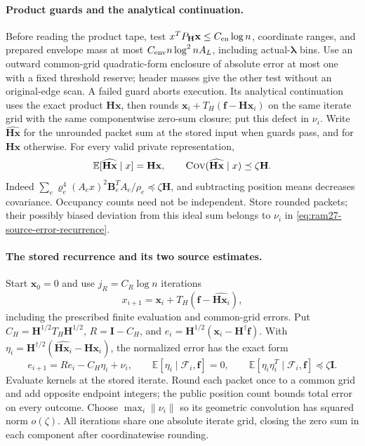 \documentclass[11pt]{article}
\theoremstyle{remark}
\newcommand{\BB}{\mathbf B}
\newcommand{\II}{\mathbf I}
\newcommand{\HH}{\mathbf H}
\newcommand{\ff}{\mathbf f}
\newcommand{\llambda}{\boldsymbol{\lambda}}
\newcommand{\vvr}{\boldsymbol{\varrho}}
\newcommand{\xx}{\mathbf x}
\newcommand{\Cov}{\textsc{Cov}}
\newcommand{\Ex}{\mathbb E}
\newcommand{\norm}[1]{\lVert#1\rVert}
\begin{document}
\paragraph{Product guards and the analytical continuation.}
Before reading the product tape, test $x^TP_{\HH}\xx\le C_{\rm en}\log n$, coordinate
ranges, and prepared envelope mass at most $C_{\rm env}n\log^2 nA_L$, including
actual-$\llambda$ bins.
Use an outward common-grid quadratic-form enclosure of absolute error at most
one with a fixed threshold reserve; header masses give the other test without an
original-edge scan.
A failed guard aborts execution.
Its analytical continuation uses the exact product $\HH\xx$, then rounds
$\xx_i+T_H(\ff-\HH\xx_i)$ on the same iterate grid with the same componentwise zero-sum
closure; put this defect in $\nu_i$.
Write $\widehat{\HH\xx}$ for the unrounded packet sum at the stored input when
guards pass, and for $\HH\xx$ otherwise.
For every valid private representation,
\begin{equation}\label{eq:ram27-product}
 \Ex[\widehat{\HH\xx}\mid x]=\HH\xx,\qquad
 \Cov(\widehat{\HH\xx}\mid x)\preceq\zeta \HH .
\end{equation}
Indeed $\sum_e \vvr_e^4(A_ex)^2\BB_e^TA_e/\rho_e\preceq\zeta \HH$, and subtracting
position means decreases covariance.
Occupancy counts need not be independent.
Store rounded packets; their possibly biased deviation from this ideal sum
belongs to $\nu_i$ in \eqref{eq:ram27-source-error-recurrence}.

\paragraph{The stored recurrence and its two source estimates.}
Start $\xx_0=0$ and use $j_R=C_R\log n$ iterations
\[
 x_{i+1}=\xx_i+T_H(\ff-\widehat{\HH\xx_i}),
\]
including the prescribed finite evaluation and common-grid errors.
Put $C_H=\HH^{1/2}T_H\HH^{1/2}$, $R=\II-C_H$, and $e_i=\HH^{1/2}(\xx_i-\HH^\dagger \ff)$.
With $\eta_i=\HH^{\dagger/2}(\widehat{\HH\xx_i}-\HH\xx_i)$, the normalized error has the
exact form
\[
 e_{i+1}=Re_i-C_H\eta_i+\nu_i,\qquad
 \Ex[\eta_i\mid\mathcal F_i,\ff]=0,\qquad
 \Ex[\eta_i\eta_i^T\mid\mathcal F_i,\ff]\preceq\zeta \II.
                                                               \tag{O5}\label{eq:ram27-source-error-recurrence}
\]
Evaluate kernels at the stored iterate.
Round each packet once to a common grid and add opposite endpoint integers; the
public position count bounds total error on every outcome.
Choose $\max_i\norm{\nu_i}$ so its geometric convolution has squared norm
$o(\zeta)$.
All iterations share one absolute iterate grid, closing the zero sum in each
component after coordinatewise rounding.
\end{document}
